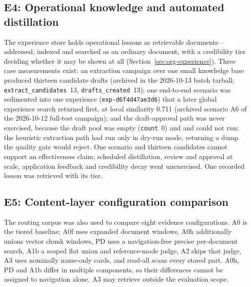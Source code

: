 \subsection{E4: Operational knowledge and automated distillation}
\label{sec:e3}

The experience store holds operational lessons as retrievable
documents---addressed, indexed and searched as an ordinary document, with a
credibility tier deciding whether it may be shown at all
(Section~\ref{sec:org-experience}). Three case measurements exist: an
extraction campaign over one small knowledge base produced thirteen
candidate drafts (archived  in the 2026-10-13
batch tarball; \texttt{extract\_candidates}~13, \texttt{drafts\_created}~13);
one end-to-end scenario was sedimented into one experience
(\texttt{exp-d6f4d47ae3d6}) that a later global experience search returned
first, at local similarity 0.711 (archived scenario A6 of the 2026-10-12
full-test campaign); and the draft-approval path was never exercised, because
the draft pool was empty (\texttt{count}~0) and 
and  could not run; the heuristic extraction
path had run only in dry-run mode, returning a dump the quality gate would
reject. One scenario and thirteen candidates cannot support an effectiveness
claim; scheduled distillation, review and approval at scale, application
feedback and credibility decay went unexercised. One recorded lesson was
retrieved with its tier.

\subsection{E5: Content-layer configuration comparison}
\label{sec:ladder-opt}
The routing corpus was also used to compare eight evidence configurations.
A0 is the tiered baseline; A0f uses expanded document windows, A0h additionally
unions vector chunk windows, PD uses a navigation-free precise per-document
search, A1b a scoped flat union and reference-mode judge, A2 skips that judge,
A3 uses nominally name-only cards, and read-all scans every stored part.
A0h, PD and A1b differ in multiple components, so their differences cannot be
assigned to navigation alone. A3 may retrieve outside the evaluation scope.

